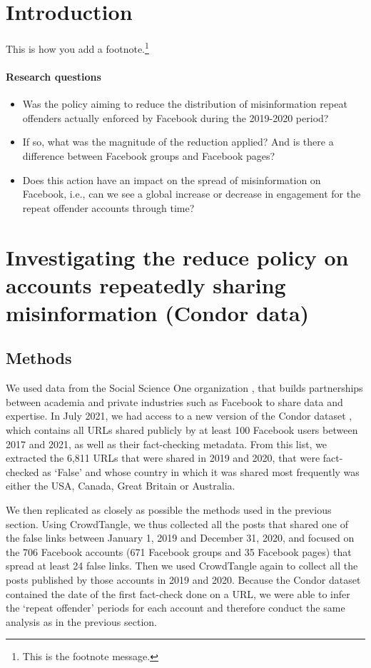 \documentclass[review]{elsarticle}
\begin{document}
\linenumbers

\section{Introduction}

This is how you add a footnote.\footnote{This is the footnote message.}

\paragraph{Research questions}
\begin{itemize}
\item Was the policy aiming to reduce the distribution of misinformation repeat offenders actually enforced by Facebook during the 2019-2020 period?
\item If so, what was the magnitude of the reduction applied? And is there a difference between Facebook groups and Facebook pages?
\item Does this action have an impact on the spread of misinformation on Facebook, i.e., can we see a global increase or decrease in engagement for the repeat offender accounts through time?
\end{itemize}

\section{Investigating the reduce policy on accounts repeatedly sharing misinformation (Condor data)}

\subsection{Methods}

We used data from the Social Science One organization \cite{king2020new}, that builds partnerships between academia and private industries such as Facebook to share data and expertise. 
In July 2021, we had access to a new version of the Condor dataset \cite{messing2020facebook}, which contains all URLs shared publicly by at least 100 Facebook users between 2017 and 2021, as well as their fact-checking metadata. 
From this list, we extracted the 6,811 URLs that were shared in 2019 and 2020, that were fact-checked as `False' and whose country in which it was shared most frequently was either the USA, Canada, Great Britain or Australia.

We then replicated as closely as possible the methods used in the previous section. 
Using CrowdTangle, we thus collected all the posts that shared one of the false links between January 1, 2019 and December 31, 2020, and focused on the 706 Facebook accounts (671 Facebook groups and 35 Facebook pages) that spread at least 24 false links. 
Then we used CrowdTangle again to collect all the posts published by those accounts in 2019 and 2020. 
Because the Condor dataset contained the date of the first fact-check done on a URL, we were able to infer the `repeat offender' periods for each account and therefore conduct the same analysis as in the previous section.
\end{document}
